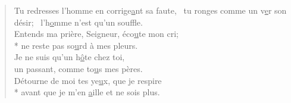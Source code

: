 \begin{verse}
Tu redresses l’homme en corrige\underline{a}nt sa faute,~\psalmdagger
tu ronges comme un v\underline{e}r son désir;~\psalmstar
l’h\underline{o}mme n’est qu’un souffle. \\

Entends ma prière, Seigneur, éco\underline{u}te mon cri; \\*
ne reste pas so\underline{u}rd à mes pleurs. \\
Je ne suis qu’un h\underline{ô}te chez toi, \\
un passant, comme to\underline{u}s mes pères. \\

Détourne de moi tes ye\underline{u}x, que je respire \\*
avant que je m’en \underline{a}ille et ne sois plus. \\
\end{verse}

